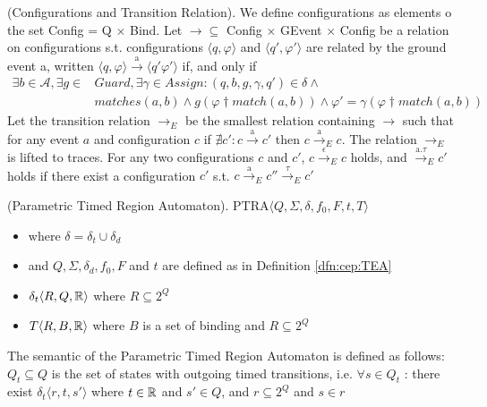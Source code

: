			\begin{dfn}
				(Configurations and Transition Relation).
				We define configurations as elements o the set Config = Q $\times$ Bind. Let $\rightarrow \subseteq$ Config $\times$ GEvent $\times$ Config be a relation on
				configurations s.t. configurations $\langle q, \varphi \rangle$ and $\langle q', \varphi' \rangle$ are related by the ground event a, written
				$\langle q, \varphi \rangle \xrightarrow{\text{a}} \langle q' \varphi' \rangle$ if, and only if
					\begin{align}
						\exists b \in \mathcal{A}, \exists g \in &Guard, \exists \gamma \in Assign : (q, b, g, \gamma, q') \in \delta \wedge \\
						&matches(a,b) \wedge g(\varphi \dag match(a,b)) \wedge \varphi' = \gamma(\varphi \dagger match(a,b))
					\end{align}
				Let the transition relation $\rightarrow_{E}$ be the smallest relation containing $\rightarrow$ such that for any event
				$a$ and configuration $c$ if $\nexists c' : c \xrightarrow{\text{a}} c'$ then $ c \xrightarrow{\text{a}}_E c$.
				The relation $\rightarrow_E$ is lifted to traces.
				For any two configurations $c$ and $c'$, $ c \xrightarrow{\text{$\epsilon$}}_E c$ holds, and $\xrightarrow{\text{a.$\tau$}}_E c'$ holds
				if there exist a configuration $c'$ s.t. $c \xrightarrow{\text{a}}_E c'' \xrightarrow{\text{$\tau$}}_E c'$
			\end{dfn}
			
			
			\begin{dfn}
				(Parametric Timed Region Automaton).
				PTRA$\langle Q, \Sigma, \delta, f_0, F, t, T \rangle$
				\begin{itemize}
					\item where $\delta = \delta_t \cup \delta_d$
					\item and $Q, \Sigma, \delta_d, f_0, F$ and $t$ are defined as in Definition \ref{dfn:cep:TEA}
					\item $\delta_t \langle R, Q, \mathbb{R} \rangle $ where $R \subseteq 2^Q$
					\item $T\langle R, B, \mathbb{R} \rangle$ where $B$ is a set of binding and  $R \subseteq 2^Q$

				\end{itemize}
				
			\end{dfn}
			
			The semantic of the Parametric Timed Region Automaton is defined as follows:
			$Q_t \subseteq Q$ is the set of states with outgoing timed transitions, i.e. $\forall s \in Q_t$ : there exist $ \delta_t\langle r, t, s' \rangle$ where $t \in \mathbb{R}$ and $s' \in Q$, and $r \subseteq 2^Q$ and $s \in r$
			
